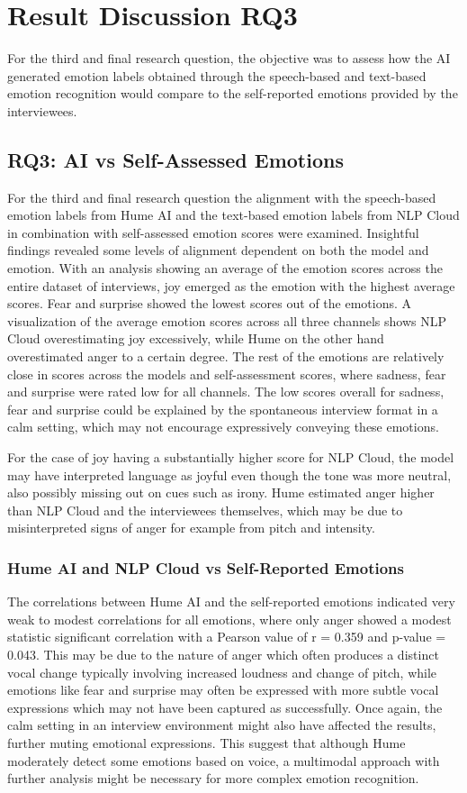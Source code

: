 
\section{Result Discussion RQ3}
For the third and final research question, the objective was to assess how the AI generated emotion labels obtained through the speech-based and text-based emotion recognition would compare to the self-reported emotions provided by the interviewees.

\subsection{RQ3: AI vs Self-Assessed Emotions}
For the third and final research question the alignment with the speech-based emotion labels from Hume AI and the text-based emotion labels from NLP Cloud in combination with self-assessed emotion scores were examined. Insightful findings revealed some levels of alignment dependent on both the model and emotion.
With an analysis showing an average of the emotion scores across the entire dataset of interviews, joy emerged as the emotion with the highest average scores. Fear and surprise showed the lowest scores out of the emotions. A visualization of the average emotion scores across all three channels shows NLP Cloud overestimating joy excessively, while Hume on the other hand overestimated anger to a certain degree.
The rest of the emotions are relatively close in scores across the models and self-assessment scores, where sadness, fear and surprise were rated low for all channels.
The low scores overall for sadness, fear and surprise could be explained by the spontaneous interview format in a calm setting, which may not encourage expressively conveying these emotions.

For the case of joy having a substantially higher score for NLP Cloud, the model may have interpreted language as joyful even though the tone was more neutral, also possibly missing out on cues such as irony.
Hume estimated anger higher than NLP Cloud and the interviewees themselves, which may be due to misinterpreted signs of anger for example from pitch and intensity.

\subsubsection{Hume AI and NLP Cloud vs Self-Reported Emotions}
The correlations between Hume AI and the self-reported emotions indicated very weak to modest correlations for all emotions, where only anger showed a modest statistic significant correlation with a Pearson value of r = 0.359 and p-value = 0.043. This may be due to the nature of anger which often produces a distinct vocal change typically involving increased loudness and change of pitch, while emotions like fear and surprise may often be expressed with more subtle vocal expressions which may not have been captured as successfully. Once again, the calm setting in an interview environment might also have affected the results, further muting emotional expressions. This suggest that although Hume moderately detect some emotions based on voice, a multimodal approach with further analysis might be necessary for more complex emotion recognition.


